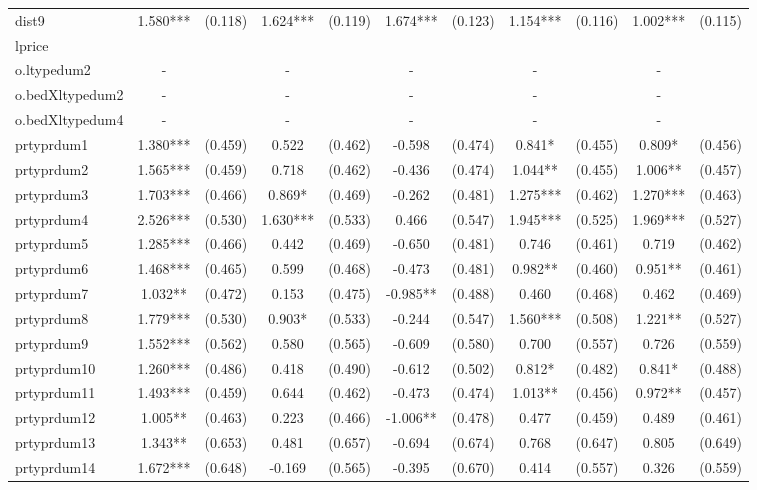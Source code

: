 \documentclass[]{article}
\begin{document}
\begin{tabular}{lcccccccccc}
dist9 & 1.580*** & (0.118) & 1.624*** & (0.119) & 1.674*** & (0.123) & 1.154*** & (0.116) & 1.002*** & (0.115) \\
lprice &  &  &  &  &  &  &  &  &  &  \\
o.ltypedum2 & - &  & - &  & - &  & - &  & - &  \\
o.bedXltypedum2 & - &  & - &  & - &  & - &  & - &  \\
o.bedXltypedum4 & - &  & - &  & - &  & - &  & - &  \\
prtyprdum1 & 1.380*** & (0.459) & 0.522 & (0.462) & -0.598 & (0.474) & 0.841* & (0.455) & 0.809* & (0.456) \\
prtyprdum2 & 1.565*** & (0.459) & 0.718 & (0.462) & -0.436 & (0.474) & 1.044** & (0.455) & 1.006** & (0.457) \\
prtyprdum3 & 1.703*** & (0.466) & 0.869* & (0.469) & -0.262 & (0.481) & 1.275*** & (0.462) & 1.270*** & (0.463) \\
prtyprdum4 & 2.526*** & (0.530) & 1.630*** & (0.533) & 0.466 & (0.547) & 1.945*** & (0.525) & 1.969*** & (0.527) \\
prtyprdum5 & 1.285*** & (0.466) & 0.442 & (0.469) & -0.650 & (0.481) & 0.746 & (0.461) & 0.719 & (0.462) \\
prtyprdum6 & 1.468*** & (0.465) & 0.599 & (0.468) & -0.473 & (0.481) & 0.982** & (0.460) & 0.951** & (0.461) \\
prtyprdum7 & 1.032** & (0.472) & 0.153 & (0.475) & -0.985** & (0.488) & 0.460 & (0.468) & 0.462 & (0.469) \\
prtyprdum8 & 1.779*** & (0.530) & 0.903* & (0.533) & -0.244 & (0.547) & 1.560*** & (0.508) & 1.221** & (0.527) \\
prtyprdum9 & 1.552*** & (0.562) & 0.580 & (0.565) & -0.609 & (0.580) & 0.700 & (0.557) & 0.726 & (0.559) \\
prtyprdum10 & 1.260*** & (0.486) & 0.418 & (0.490) & -0.612 & (0.502) & 0.812* & (0.482) & 0.841* & (0.488) \\
prtyprdum11 & 1.493*** & (0.459) & 0.644 & (0.462) & -0.473 & (0.474) & 1.013** & (0.456) & 0.972** & (0.457) \\
prtyprdum12 & 1.005** & (0.463) & 0.223 & (0.466) & -1.006** & (0.478) & 0.477 & (0.459) & 0.489 & (0.461) \\
prtyprdum13 & 1.343** & (0.653) & 0.481 & (0.657) & -0.694 & (0.674) & 0.768 & (0.647) & 0.805 & (0.649) \\
prtyprdum14 & 1.672*** & (0.648) & -0.169 & (0.565) & -0.395 & (0.670) & 0.414 & (0.557) & 0.326 & (0.559) \\

\end{tabular}
\end{document}
